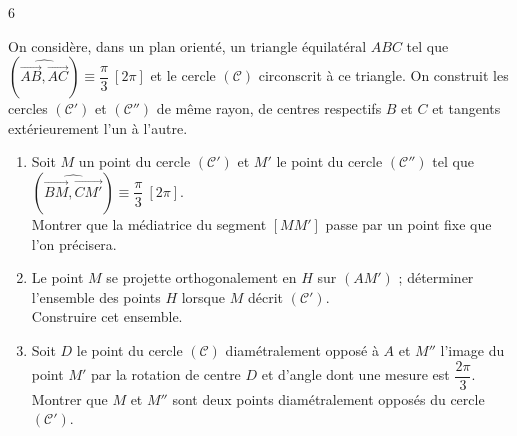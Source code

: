 \documentclass{axiobac}
\begin{document}
\entete

\begin{exercice}{6}

On considère, dans un plan orienté, un triangle équilatéral $ABC$ tel que $\left(\widehat{\overrightarrow{AB}, \overrightarrow{AC}}\right) \equiv \dfrac{\pi}{3} \ [2\pi]$ et le cercle $(\mathcal{C})$ circonscrit à ce triangle. On construit les cercles $(\mathcal{C}')$ et $(\mathcal{C}'')$ de même rayon, de centres respectifs $B$ et $C$ et tangents extérieurement l'un à l'autre.

\begin{enumerate}
    \item Soit $M$ un point du cercle $(\mathcal{C}')$ et $M'$ le point du cercle $(\mathcal{C}'')$ tel que $\left(\widehat{\overrightarrow{BM}, \overrightarrow{CM'}}\right) \equiv \dfrac{\pi}{3} \ [2\pi]$. \\
    Montrer que la médiatrice du segment $[MM']$ passe par un point fixe que l'on précisera.
    \item Le point $M$ se projette orthogonalement en $H$ sur $(AM')$ ; déterminer l'ensemble des points $H$ lorsque $M$ décrit $(\mathcal{C}')$. \\
    Construire cet ensemble.
    \item Soit $D$ le point du cercle $(\mathcal{C})$ diamétralement opposé à $A$ et $M''$ l'image du point $M'$ par la rotation de centre $D$ et d'angle dont une mesure est $\dfrac{2\pi}{3}$. \\
    Montrer que $M$ et $M''$ sont deux points diamétralement opposés du cercle $(\mathcal{C}')$.
\end{enumerate}

\end{exercice}
\end{document}
